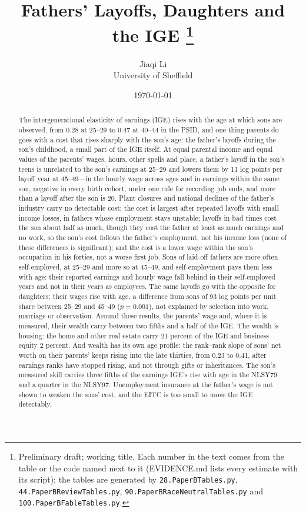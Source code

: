 \documentclass[11pt]{article}
\begin{document}
\title{Fathers' Layoffs, Daughters and the IGE
\thanks{\footnotesize Preliminary draft; working title. Each number in the text comes from the table or the code named
next to it (EVIDENCE.md lists every estimate with its script); the tables are generated by \texttt{28.PaperBTables.py}, \texttt{44.PaperBReviewTables.py},
\texttt{90.PaperBRaceNeutralTables.py} and \texttt{100.PaperBFableTables.py}.}}
\author{Jiaqi Li \\ University of Sheffield}
\date{\today}
\maketitle

\begin{abstract}
\noindent The intergenerational elasticity of earnings (IGE) rises with the age at which sons are observed, from 0.28
at 25--29 to 0.47 at 40--44 in the PSID, and one thing parents do goes with a cost that rises sharply with the son's age: the
father's layoffs during the son's childhood, a small part of the IGE itself. At equal parental income and equal values of the parents' wages, hours,
other spells and place, a father's layoff in the son's teens is unrelated to the son's earnings at 25--29 and lowers
them by 11 log points per layoff year at 45--49---in the hourly wage across ages and in earnings within the same son,
negative in every birth cohort, under one
rule for recording job ends, and more than a layoff after the son is 20. Plant closures and national declines of the
father's industry carry no detectable cost; the cost is largest after repeated layoffs with small income losses, in fathers whose
employment stays unstable; layoffs in bad times cost the son about half as much, though they cost the father at least as much earnings and no work, so the son's cost follows the father's employment, not his income loss (none of these differences is significant); and the cost is a lower wage within the son's
occupation in his forties, not a worse first job. Sons of laid-off fathers are more often self-employed, at 25--29 and
more so at 45--49, and self-employment pays them less with age: their reported earnings and hourly wage fall behind in their
self-employed years and not in their years as employees. The same layoffs go with the opposite for daughters: their wages rise with
age, a difference from sons of 93 log points per unit share between 25--29 and 45--49 ($p = 0.001$), not explained by
selection into work, marriage or observation. Around these results, the parents' wage and, where it is measured,
their wealth carry between two fifths and a half of the IGE. The wealth is housing: the home and other real estate carry 21
percent of the IGE and business equity 2 percent. And wealth has its own age profile: the rank--rank slope of sons'
net worth on their parents' keeps rising into the late thirties, from 0.23 to 0.41, after earnings ranks have stopped
rising, and not through gifts or inheritances. The son's measured skill carries three fifths of the earnings IGE's rise
with age in the NLSY79 and a quarter in the NLSY97. Unemployment
insurance at the father's wage is not shown to weaken the sons' cost, and the EITC is too small to move the IGE detectably.
\end{abstract}
\end{document}
